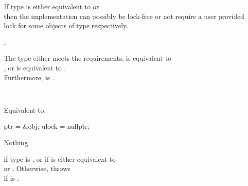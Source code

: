 \begin{itemdescr}
\begin{addedblock}
\pnum
\mandates If type  is either equivalent to  
or \\  then the implementation can possibly be
lock-free or not require a user provided lock for some objects of type  
respectively.
\end{addedblock}

\pnum
{}.
\begin{addedblock}
\expects The type  either meets the  requirements, 
 is equivalent to \\ , or
 is equivalent to .
\\ Furthermore,  is .
\end{addedblock}

\pnum
\effects {}\\
\begin{addedblock}Equivalent to:
\begin{codeblock}
  ptr = &obj;
  ulock = nullptr;
\end{codeblock}
\end{addedblock}

\pnum
\throws Nothing 
\begin{addedblock}
if type  is , or if  is
either equivalent to \\  or 
.
Otherwise, throws \\  if 
 is ;
\end{addedblock}
\end{itemdescr}



